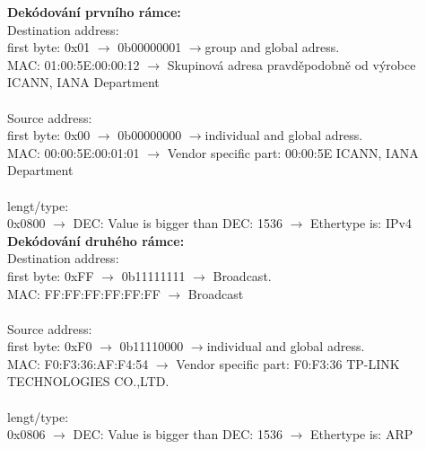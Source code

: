 \documentclass[10pt, a4paper]{article}%
\begin{document}
\begin{itemize}[label={}]
			\textbf{Dekódování prvního rámce:}\\
			Destination address:\\
			first byte: 0x01 $\rightarrow$ 0b00000001 $\rightarrow$group and global adress.\\
			MAC: 01:00:5E:00:00:12 $\rightarrow$ Skupinová adresa pravděpodobně od výrobce ICANN, IANA Department\\\\
			Source address:\\
			first byte: 0x00 $\rightarrow$ 0b00000000 $\rightarrow$individual and global adress.\\
			MAC: 00:00:5E:00:01:01 $\rightarrow$ Vendor specific part: 00:00:5E ICANN, IANA Department\\\\
			lengt/type:\\
			0x0800 $\rightarrow$ DEC: Value is bigger than DEC: 1536 $\rightarrow$ Ethertype is: IPv4\\
			
			\textbf{Dekódování druhého rámce:}\\
			Destination address:\\
			first byte: 0xFF $\rightarrow$ 0b11111111 $\rightarrow$ Broadcast.\\
			MAC: FF:FF:FF:FF:FF:FF $\rightarrow$ Broadcast\\\\
			Source address:\\
			first byte: 0xF0 $\rightarrow$ 0b11110000 $\rightarrow$individual and global adress.\\
			MAC: F0:F3:36:AF:F4:54 $\rightarrow$ Vendor specific part: F0:F3:36 TP-LINK TECHNOLOGIES CO.,LTD.\\\\
			lengt/type:\\
			0x0806 $\rightarrow$ DEC: Value is bigger than DEC: 1536 $\rightarrow$ Ethertype is: ARP
		\end{itemize}
	
	\clearpage
\end{document}
